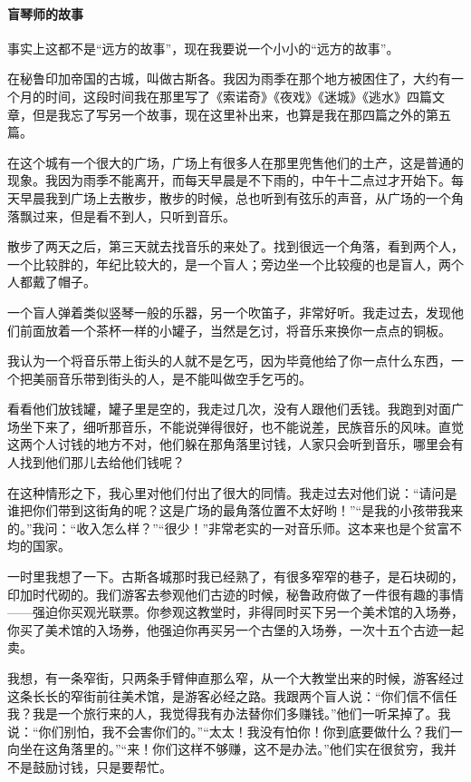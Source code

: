 \paragraph*{盲琴师的故事}
\par 事实上这都不是“远方的故事”，现在我要说一个小小的“远方的故事”。
\par 在秘鲁印加帝国的古城，叫做古斯各。我因为雨季在那个地方被困住了，大约有一个月的时间，这段时间我在那里写了《索诺奇》《夜戏》《迷城》《逃水》四篇文章，但是我忘了写另一个故事，现在这里补出来，也算是我在那四篇之外的第五篇。
\par 在这个城有一个很大的广场，广场上有很多人在那里兜售他们的土产，这是普通的现象。我因为雨季不能离开，而每天早晨是不下雨的，中午十二点过才开始下。每天早晨我到广场上去散步，散步的时候，总也听到有弦乐的声音，从广场的一个角落飘过来，但是看不到人，只听到音乐。
\par 散步了两天之后，第三天就去找音乐的来处了。找到很远一个角落，看到两个人，一个比较胖的，年纪比较大的，是一个盲人；旁边坐一个比较瘦的也是盲人，两个人都戴了帽子。
\par 一个盲人弹着类似竖琴一般的乐器，另一个吹笛子，非常好听。我走过去，发现他们前面放着一个茶杯一样的小罐子，当然是乞讨，将音乐来换你一点点的铜板。
\par 我认为一个将音乐带上街头的人就不是乞丐，因为毕竟他给了你一点什么东西，一个把美丽音乐带到街头的人，是不能叫做空手乞丐的。
\par 看看他们放钱罐，罐子里是空的，我走过几次，没有人跟他们丢钱。我跑到对面广场坐下来了，细听那音乐，不能说弹得很好，也不能说差，民族音乐的风味。直觉这两个人讨钱的地方不对，他们躲在那角落里讨钱，人家只会听到音乐，哪里会有人找到他们那儿去给他们钱呢？
\par 在这种情形之下，我心里对他们付出了很大的同情。我走过去对他们说：“请问是谁把你们带到这街角的呢？这是广场的最角落位置不太好哟！”“是我的小孩带我来的。”我问：“收入怎么样？”“很少！”非常老实的一对音乐师。这本来也是个贫富不均的国家。
\par 一时里我想了一下。古斯各城那时我已经熟了，有很多窄窄的巷子，是石块砌的，印加时代砌的。我们游客去参观他们古迹的时候，秘鲁政府做了一件很有趣的事情——强迫你买观光联票。你参观这教堂时，非得同时买下另一个美术馆的入场券，你买了美术馆的入场券，他强迫你再买另一个古堡的入场券，一次十五个古迹一起卖。
\par 我想，有一条窄街，只两条手臂伸直那么窄，从一个大教堂出来的时候，游客经过这条长长的窄街前往美术馆，是游客必经之路。我跟两个盲人说：“你们信不信任我？我是一个旅行来的人，我觉得我有办法替你们多赚钱。”他们一听呆掉了。我说：“你们别怕，我不会害你们的。”“太太！我没有怕你！你到底要做什么？我们一向坐在这角落里的。”“来！你们这样不够赚，这不是办法。”他们实在很贫穷，我并不是鼓励讨钱，只是要帮忙。
